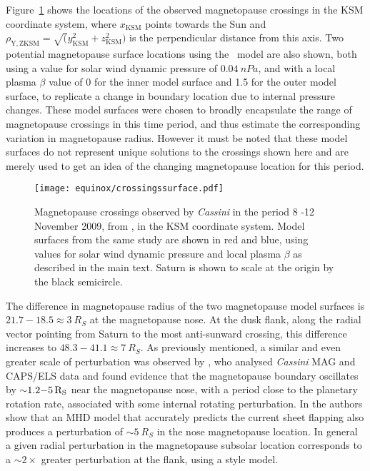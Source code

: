 Figure~\ref{equinox:fig:crossingssurface} shows the locations of the observed magnetopause crossings in the KSM coordinate system, where $x_\mathrm{KSM}$ points towards the Sun and $\rho_\mathrm{Y,ZKSM} = \sqrt(y_\mathrm{KSM}^2 + z_\mathrm{KSM}^2)$ is the perpendicular distance from this axis. Two potential magnetopause surface locations using the~\citet{pilkington2015} model are also shown, both using a value for solar wind dynamic pressure of $\SI{0.04}{nPa}$, and with a local plasma $\beta$ value of 0 for the inner model surface and 1.5 for the outer model surface, to replicate a change in boundary location due to internal pressure changes. These model surfaces were chosen to broadly encapsulate the range of magnetopause crossings in this time period, and thus estimate the corresponding variation in magnetopause radius. However it must be noted that these model surfaces do not represent unique solutions to the crossings shown here and are merely used to get an idea of the changing magnetopause location for this period.

\begin{figure}
\centering
\texttt{[image: equinox/crossingssurface.pdf]}
\caption[Magnetopause crossings observed by \textit{Cassini}, and model magnetopause surfaces.]{Magnetopause crossings observed by \textit{Cassini} in the period 8 -12 November 2009, from \citet{pilkington2015}, in the KSM coordinate system. Model surfaces from the same study are shown in red and blue, using values for solar wind dynamic pressure and local plasma $\beta$ as described in the main text. Saturn is shown to scale at the origin by the black semicircle.}
\label{equinox:fig:crossingssurface}
\end{figure}

The difference in magnetopause radius of the two magnetopause model surfaces is $21.7-18.5 \approx\SI{3}{R_S}$ at the magnetopause nose. At the dusk flank, along the radial vector pointing from Saturn to the most anti-sunward crossing, this difference increases to $48.3-41.1\approx\SI{7}{R_S}$. As previously mentioned, a similar and even greater scale of perturbation was observed by \citet{clarke2010}, who analysed \textit{Cassini} MAG and CAPS/ELS data and found evidence that the magnetopause boundary oscillates by ${\sim}1.2{\--}\SI{5}{R_S}$ near the magnetopause nose, with a period close to the planetary rotation rate, associated with some internal rotating perturbation. In \citet{kivelson2014} the authors show that an MHD model that accurately predicts the current sheet flapping also produces a perturbation of ${\sim}\SI{5}{R_S}$ in the nose magnetopause location. In general a given radial perturbation in the magnetopause subsolar location corresponds to a ${\sim}2\times$ greater perturbation at the flank, using a \citet{pilkington2015} style model.

